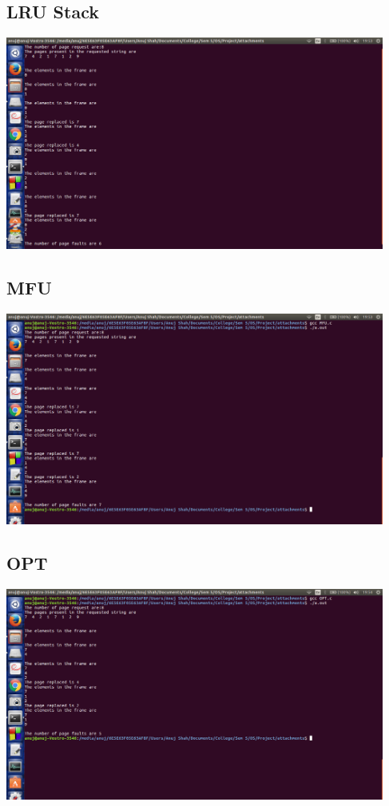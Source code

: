 \documentclass[12pt]{article}
\begin{document}
\begin{flushleft}
		\subsection{LRU Stack}
		\includegraphics[height=7cm]{LRUstack_result.png}
		\subsection{MFU}
		\includegraphics[height=7cm]{MFU_result.png}
	    \subsection{OPT}
		\includegraphics[height=7cm]{OPT_result.png}

\end{flushleft}
\end{document}
